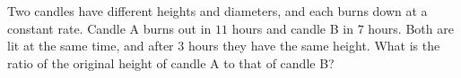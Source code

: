 Two candles have different heights and diameters, and each burns down at a constant rate. Candle A burns out in $11$ hours and candle B in $7$ hours. Both are lit at the same time, and after $3$ hours they have the same height. What is the ratio of the original height of candle A to that of candle B?
